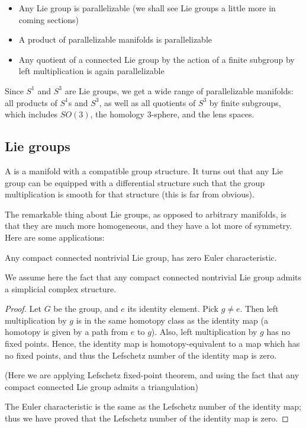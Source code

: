 \documentclass[a4paper]{amsart}
\begin{document}
\begin{itemize}

\item Any Lie group is parallelizable (we shall see Lie groups a
  little more in coming sections)

\item A product of parallelizable manifolds is parallelizable

\item Any quotient of a connected Lie group by the action of a finite
  subgroup by left multiplication is again parallelizable

\end{itemize}

Since $S^1$ and $S^3$ are Lie groups, we get a wide range of
parallelizable manifolds: all products of $S^1$s and $S^3$, as well as
all quotients of $S^3$ by finite subgroups, which includes $SO(3)$,
the homology $3$-sphere, and the lens spaces.

\subsection{Lie groups}

\begin{definer}
  A  is a manifold with a compatible group structure.  It
  turns out that any Lie group can be equipped with a differential
  structure such that the group multiplication is smooth for that
  structure (this is far from obvious).
\end{definer}

The remarkable thing about Lie groups, as opposed to arbitrary
manifolds, is that they are much more homogeneous, and they have a lot
more of symmetry. Here are some applications:

\begin{theorem}
  Any compact connected nontrivial Lie group, has zero Euler characteristic.
\end{theorem}

We assume here the fact that any compact connected nontrivial Lie
group admits a simplicial complex structure.

\begin{proof}
  Let $G$ be the group, and $e$ its identity element. Pick $g \ne
  e$. Then left multiplication by $g$ is in the same homotopy class as
  the identity map (a homotopy is given by a path from $e$ to $g$).
  Also, left multiplication by $g$ has no fixed points. Hence, the
  identity map is homotopy-equivalent to a map which has no fixed
  points, and thus the Lefschetz number of the identity map is zero.

  (Here we are applying Lefschetz fixed-point theorem, and using the
  fact that any compact connected Lie group admits a triangulation)

  The Euler characteristic is the same as the Lefschetz number of the
  identity map; thus we have proved that the Lefschetz number of the
  identity map is zero.
\end{proof}
\end{document}
